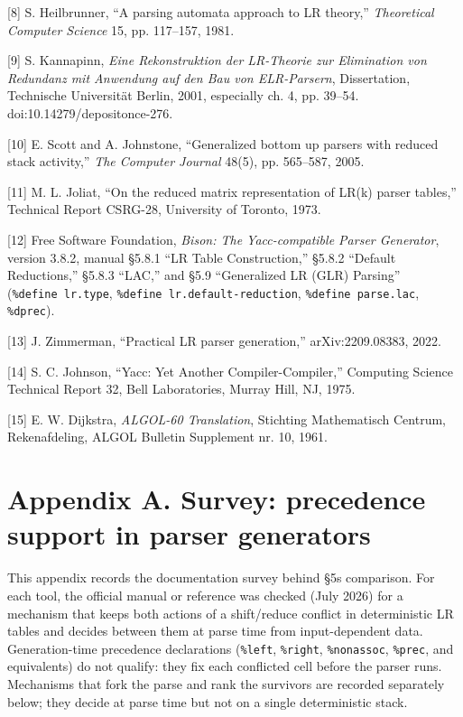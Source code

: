 \documentclass[
  10pt,
]{article}
\begin{document}
{[}8{]} S. Heilbrunner, ``A parsing automata approach to LR theory,''
\emph{Theoretical Computer Science} 15, pp. 117--157, 1981.

{[}9{]} S. Kannapinn, \emph{Eine Rekonstruktion der LR-Theorie zur
Elimination von Redundanz mit Anwendung auf den Bau von ELR-Parsern},
Dissertation, Technische Universität Berlin, 2001, especially ch. 4, pp.
39--54. doi:10.14279/depositonce-276.

{[}10{]} E. Scott and A. Johnstone, ``Generalized bottom up parsers with
reduced stack activity,'' \emph{The Computer Journal} 48(5), pp.
565--587, 2005.

{[}11{]} M. L. Joliat, ``On the reduced matrix representation of LR(k)
parser tables,'' Technical Report CSRG-28, University of Toronto, 1973.

{[}12{]} Free Software Foundation, \emph{Bison: The Yacc-compatible
Parser Generator}, version 3.8.2, manual §5.8.1 ``LR Table
Construction,'' §5.8.2 ``Default Reductions,'' §5.8.3 ``LAC,'' and §5.9
``Generalized LR (GLR) Parsing'' (\texttt{\%define\ lr.type},
\texttt{\%define\ lr.default-reduction}, \texttt{\%define\ parse.lac},
\texttt{\%dprec}).

{[}13{]} J. Zimmerman, ``Practical LR parser generation,''
arXiv:2209.08383, 2022.

{[}14{]} S. C. Johnson, ``Yacc: Yet Another Compiler-Compiler,''
Computing Science Technical Report 32, Bell Laboratories, Murray Hill,
NJ, 1975.

{[}15{]} E. W. Dijkstra, \emph{ALGOL-60 Translation}, Stichting
Mathematisch Centrum, Rekenafdeling, ALGOL Bulletin Supplement nr. 10,
1961.

\hypertarget{appendix-a-survey-precedence-support-in-parser-generators}{%
\section{Appendix A. Survey: precedence support in parser
generators}\label{appendix-a-survey-precedence-support-in-parser-generators}}

This appendix records the documentation survey behind
§5\textquotesingle s comparison. For each tool, the official manual or
reference was checked (July 2026) for a mechanism that keeps both
actions of a shift/reduce conflict in deterministic LR tables and
decides between them at parse time from input-dependent data.
Generation-time precedence declarations (\texttt{\%left},
\texttt{\%right}, \texttt{\%nonassoc}, \texttt{\%prec}, and equivalents)
do not qualify: they fix each conflicted cell before the parser runs.
Mechanisms that fork the parse and rank the survivors are recorded
separately below; they decide at parse time but not on a single
deterministic stack.
\end{document}
